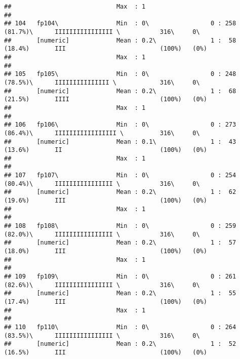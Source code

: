 \documentclass[]{article}
\begin{document}
\begin{verbatim}
##                             Max  : 1                                                                                       
## 
## 104   fp104\                Min  : 0\                 0 : 258 (81.7%)\      IIIIIIIIIIIIIIII \           316\     0\       
##       [numeric]             Mean : 0.2\               1 :  58 (18.4%)       III                          (100%)   (0%)     
##                             Max  : 1                                                                                       
## 
## 105   fp105\                Min  : 0\                 0 : 248 (78.5%)\      IIIIIIIIIIIIIII \            316\     0\       
##       [numeric]             Mean : 0.2\               1 :  68 (21.5%)       IIII                         (100%)   (0%)     
##                             Max  : 1                                                                                       
## 
## 106   fp106\                Min  : 0\                 0 : 273 (86.4%)\      IIIIIIIIIIIIIIIII \          316\     0\       
##       [numeric]             Mean : 0.1\               1 :  43 (13.6%)       II                           (100%)   (0%)     
##                             Max  : 1                                                                                       
## 
## 107   fp107\                Min  : 0\                 0 : 254 (80.4%)\      IIIIIIIIIIIIIIII \           316\     0\       
##       [numeric]             Mean : 0.2\               1 :  62 (19.6%)       III                          (100%)   (0%)     
##                             Max  : 1                                                                                       
## 
## 108   fp108\                Min  : 0\                 0 : 259 (82.0%)\      IIIIIIIIIIIIIIII \           316\     0\       
##       [numeric]             Mean : 0.2\               1 :  57 (18.0%)       III                          (100%)   (0%)     
##                             Max  : 1                                                                                       
## 
## 109   fp109\                Min  : 0\                 0 : 261 (82.6%)\      IIIIIIIIIIIIIIII \           316\     0\       
##       [numeric]             Mean : 0.2\               1 :  55 (17.4%)       III                          (100%)   (0%)     
##                             Max  : 1                                                                                       
## 
## 110   fp110\                Min  : 0\                 0 : 264 (83.5%)\      IIIIIIIIIIIIIIII \           316\     0\       
##       [numeric]             Mean : 0.2\               1 :  52 (16.5%)       III                          (100%)   (0%)     

\end{verbatim}
\end{document}
